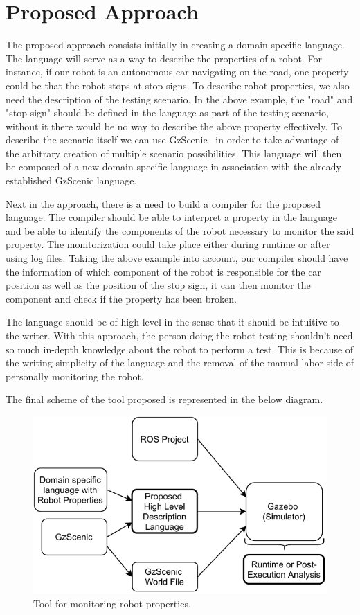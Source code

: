 \chapter{Proposed Approach}
\label{chap:approach}


The proposed approach consists initially in creating a domain-specific language.
The language will serve as a way to describe the properties of a robot.
For instance, if our robot is an autonomous car navigating on the road, 
one property could be that the robot stops at stop signs.
To describe robot properties, we also need the description of the testing scenario.
In the above example, the "road" and "stop sign" should be defined in the language as part of the 
testing scenario, without it there would be no way to describe the above property effectively.
To describe the scenario itself we can use GzScenic~\cite{GzScenic} in order to take 
advantage of the arbitrary creation of multiple scenario possibilities.
This language will then be composed of a new domain-specific language in association 
with the already established GzScenic language.

\par

Next in the approach, there is a need to build a compiler for the proposed language.
The compiler should be able to interpret a property in the language and be able to
identify the components of the robot necessary to monitor the said property.
The monitorization could take place either during runtime or after using log files.
Taking the above example into account, our compiler should have the information of which 
component of the robot is responsible for the car position as well as the position of the 
stop sign, it can then monitor the component and check if the property has been broken.

\par

The language should be of high level in the sense that it should be intuitive to the writer.
With this approach, the person doing the robot testing shouldn't need so much in-depth 
knowledge about the robot to perform a test. This is because of the writing simplicity of 
the language and the removal of the manual labor side of personally monitoring the robot.

\par

The final scheme of the tool proposed is represented in the below diagram.

\begin{figure}
    \includegraphics{images/intro_diag.pdf}
    \caption{Tool for monitoring robot properties.}
    \label{fig:intro_objectives}
\end{figure}
